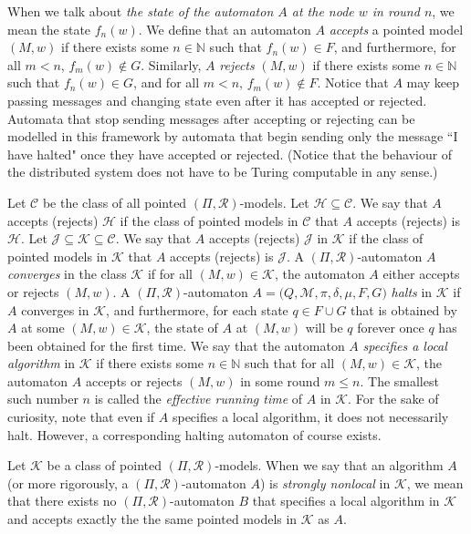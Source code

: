 \documentclass[copyright,creativecommons]{eptcs}
\begin{document}
When we talk about \emph{the state of the automaton $A$ at the node $w$ in round $n$}, we mean
the state $f_n(w)$. We define that an automaton $A$ \emph{accepts} a
pointed model $(M,w)$ if there exists some $n\in\mathbb{N}$
such that $f_n(w) \in F$, and furthermore, for all $m<n$, $f_m(w) \not\in G$.
Similarly, $A$ \emph{rejects} $(M,w)$ if there exists some $n\in\mathbb{N}$
such that $f_n(w) \in G$, and for all $m<n$, $f_m(w) \not\in F$. 
Notice that $A$ may keep passing messages and changing state even after it has accepted or rejected.
Automata that stop sending messages after accepting or rejecting can be 
modelled in this framework by automata that begin sending only the message
``I have halted" once they have accepted or rejected.
(Notice that the behaviour of the distributed system does not
have to be Turing computable in any sense.)




Let $\mathcal{C}$ be the class of all pointed $(\Pi,\mathcal{R})$-models. Let $\mathcal{H}\subseteq\mathcal{C}$.
We say that $A$ accepts (rejects) $\mathcal{H}$
if the class of pointed models in $\mathcal{C}$ that $A$ accepts (rejects) is $\mathcal{H}$.
Let $\mathcal{J}\subseteq \mathcal{K}\subseteq\mathcal{C}$.
We say that $A$ accepts (rejects) $\mathcal{J}$ in $\mathcal{K}$
if the class of pointed models in $\mathcal{K}$ that $A$ accepts (rejects) is $\mathcal{J}$.
A $(\Pi,\mathcal{R})$-automaton $A$
\emph{converges} in the class $\mathcal{K}$ if for all $(M,w)\in\mathcal{K}$, the automaton $A$ either
accepts or rejects $(M,w)$.
A $(\Pi,\mathcal{R})$-automaton $A = \bigl(Q,\mathcal{M},\pi,\delta,\mu,F,G\bigr)$
\emph{halts} in $\mathcal{K}$
if $A$ converges in $\mathcal{K}$, and furthermore,
for each state $q\in F\cup G$ that is obtained by $A$
at some $(M,w)\in\mathcal{K}$, the state of $A$ at $(M,w)$
will be $q$ forever once $q$ has been obtained for the first time.
We say that the automaton $A$ \emph{specifies a local algorithm} in $\mathcal{K}$
if there exists some $n\in\mathbb{N}$ such that for all $(M,w)\in\mathcal{K}$,
the automaton $A$ accepts or rejects $(M,w)$ in some round $m\leq n$.
The smallest such number $n$ is called the \emph{effective running time} of $A$ in $\mathcal{K}$.
For the sake of curiosity, note that even if $A$ specifies a local algorithm, it
does not necessarily halt. However, a corresponding halting automaton of course exists.




Let $\mathcal{K}$ be a class of pointed $(\Pi,\mathcal{R})$-models.
When we say that an algorithm $A$ (or more 
rigorously, a $(\Pi,\mathcal{R})$-automaton $A$) is \emph{strongly
nonlocal} in $\mathcal{K}$, we mean that there exists no $(\Pi,\mathcal{R})$-automaton
$B$ that specifies a local algorithm in $\mathcal{K}$ and accepts
exactly the the same pointed models in $\mathcal{K}$ as $A$.
\end{document}
